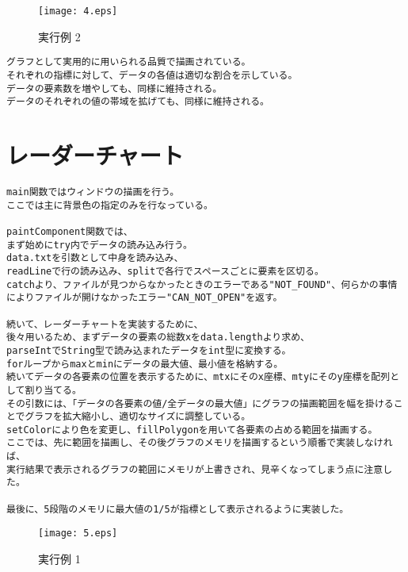 \documentclass{jarticle}
\begin{document}
\begin{figure}[H]
\begin{center}
\texttt{[image: 4.eps]}
\end{center}
\caption{実行例 2}
\end{figure}

\begin{verbatim}
グラフとして実用的に用いられる品質で描画されている。
それぞれの指標に対して、データの各値は適切な割合を示している。
データの要素数を増やしても、同様に維持される。
データのそれぞれの値の帯域を拡げても、同様に維持される。
\end{verbatim}

\newpage
\section{レーダーチャート}
\begin{verbatim}
main関数ではウィンドウの描画を行う。
ここでは主に背景色の指定のみを行なっている。

paintComponent関数では、
まず始めにtry内でデータの読み込み行う。
data.txtを引数として中身を読み込み、
readLineで行の読み込み、splitで各行でスペースごとに要素を区切る。
catchより、ファイルが見つからなかったときのエラーである"NOT_FOUND"、何らかの事情によりファイルが開けなかったエラー"CAN_NOT_OPEN"を返す。

続いて、レーダーチャートを実装するために、
後々用いるため、まずデータの要素の総数xをdata.lengthより求め、
parseIntでString型で読み込まれたデータをint型に変換する。
forループからmaxとminにデータの最大値、最小値を格納する。
続いてデータの各要素の位置を表示するために、mtxにそのx座標、mtyにそのy座標を配列として割り当てる。
その引数には、「データの各要素の値/全データの最大値」にグラフの描画範囲を幅を掛けることでグラフを拡大縮小し、適切なサイズに調整している。
setColorにより色を変更し、fillPolygonを用いて各要素の占める範囲を描画する。
ここでは、先に範囲を描画し、その後グラフのメモリを描画するという順番で実装しなければ、
実行結果で表示されるグラフの範囲にメモリが上書きされ、見辛くなってしまう点に注意した。

最後に、5段階のメモリに最大値の1/5が指標として表示されるように実装した。
\end{verbatim}

\begin{figure}[H]
\begin{center}
\texttt{[image: 5.eps]}
\end{center}
\caption{実行例 1}
\end{figure}
\end{document}
